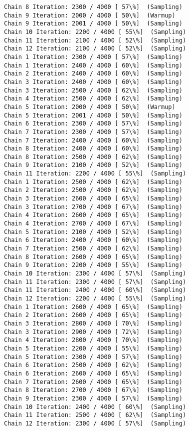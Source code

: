 \documentclass[11pt]{article}
\begin{document}
\begin{Verbatim}[commandchars=\\\{\}]
Chain 8 Iteration: 2300 / 4000 [ 57\%]  (Sampling)
Chain 9 Iteration: 2000 / 4000 [ 50\%]  (Warmup)
Chain 9 Iteration: 2001 / 4000 [ 50\%]  (Sampling)
Chain 10 Iteration: 2200 / 4000 [ 55\%]  (Sampling)
Chain 11 Iteration: 2100 / 4000 [ 52\%]  (Sampling)
Chain 12 Iteration: 2100 / 4000 [ 52\%]  (Sampling)
Chain 1 Iteration: 2300 / 4000 [ 57\%]  (Sampling)
Chain 1 Iteration: 2400 / 4000 [ 60\%]  (Sampling)
Chain 2 Iteration: 2400 / 4000 [ 60\%]  (Sampling)
Chain 3 Iteration: 2400 / 4000 [ 60\%]  (Sampling)
Chain 3 Iteration: 2500 / 4000 [ 62\%]  (Sampling)
Chain 4 Iteration: 2500 / 4000 [ 62\%]  (Sampling)
Chain 5 Iteration: 2000 / 4000 [ 50\%]  (Warmup)
Chain 5 Iteration: 2001 / 4000 [ 50\%]  (Sampling)
Chain 6 Iteration: 2300 / 4000 [ 57\%]  (Sampling)
Chain 7 Iteration: 2300 / 4000 [ 57\%]  (Sampling)
Chain 7 Iteration: 2400 / 4000 [ 60\%]  (Sampling)
Chain 8 Iteration: 2400 / 4000 [ 60\%]  (Sampling)
Chain 8 Iteration: 2500 / 4000 [ 62\%]  (Sampling)
Chain 9 Iteration: 2100 / 4000 [ 52\%]  (Sampling)
Chain 11 Iteration: 2200 / 4000 [ 55\%]  (Sampling)
Chain 1 Iteration: 2500 / 4000 [ 62\%]  (Sampling)
Chain 2 Iteration: 2500 / 4000 [ 62\%]  (Sampling)
Chain 3 Iteration: 2600 / 4000 [ 65\%]  (Sampling)
Chain 3 Iteration: 2700 / 4000 [ 67\%]  (Sampling)
Chain 4 Iteration: 2600 / 4000 [ 65\%]  (Sampling)
Chain 4 Iteration: 2700 / 4000 [ 67\%]  (Sampling)
Chain 5 Iteration: 2100 / 4000 [ 52\%]  (Sampling)
Chain 6 Iteration: 2400 / 4000 [ 60\%]  (Sampling)
Chain 7 Iteration: 2500 / 4000 [ 62\%]  (Sampling)
Chain 8 Iteration: 2600 / 4000 [ 65\%]  (Sampling)
Chain 9 Iteration: 2200 / 4000 [ 55\%]  (Sampling)
Chain 10 Iteration: 2300 / 4000 [ 57\%]  (Sampling)
Chain 11 Iteration: 2300 / 4000 [ 57\%]  (Sampling)
Chain 11 Iteration: 2400 / 4000 [ 60\%]  (Sampling)
Chain 12 Iteration: 2200 / 4000 [ 55\%]  (Sampling)
Chain 1 Iteration: 2600 / 4000 [ 65\%]  (Sampling)
Chain 2 Iteration: 2600 / 4000 [ 65\%]  (Sampling)
Chain 3 Iteration: 2800 / 4000 [ 70\%]  (Sampling)
Chain 3 Iteration: 2900 / 4000 [ 72\%]  (Sampling)
Chain 4 Iteration: 2800 / 4000 [ 70\%]  (Sampling)
Chain 5 Iteration: 2200 / 4000 [ 55\%]  (Sampling)
Chain 5 Iteration: 2300 / 4000 [ 57\%]  (Sampling)
Chain 6 Iteration: 2500 / 4000 [ 62\%]  (Sampling)
Chain 6 Iteration: 2600 / 4000 [ 65\%]  (Sampling)
Chain 7 Iteration: 2600 / 4000 [ 65\%]  (Sampling)
Chain 8 Iteration: 2700 / 4000 [ 67\%]  (Sampling)
Chain 9 Iteration: 2300 / 4000 [ 57\%]  (Sampling)
Chain 10 Iteration: 2400 / 4000 [ 60\%]  (Sampling)
Chain 11 Iteration: 2500 / 4000 [ 62\%]  (Sampling)
Chain 12 Iteration: 2300 / 4000 [ 57\%]  (Sampling)

\end{Verbatim}
\end{document}
